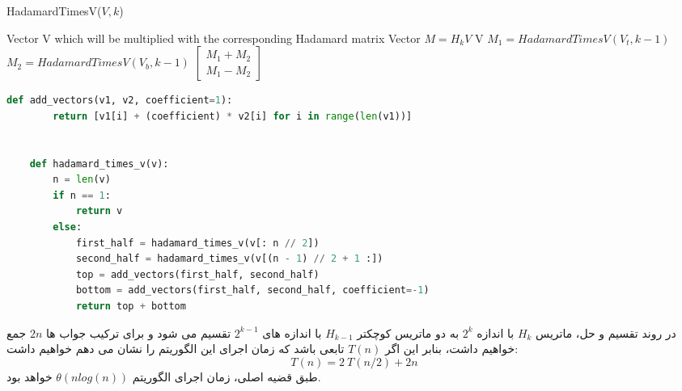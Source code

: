 \documentclass[]{article}
\begin{document}
\begin{latin}
    \begin{algorithm}[H]
        \caption*{HadamardTimesV($V, k$)}
        \begin{algorithmic}
            \Require Vector V which will be multiplied with the corresponding Hadamard matrix
            \Ensure Vector $M = H_kV$
                \State \Return V
            \Else
                \State $M_1 = HadamardTimesV(V_t, k-1)$
                \State $M_2 = HadamardTimesV(V_b, k-1)$
                \State \Return $\left[
                        \begin{matrix}
                            M_1 + M_2 \\
                            M_1 - M_2
                        \end{matrix}  
                        \right]
                       $
            \EndIf
        \end{algorithmic}
    \end{algorithm}
\end{latin}

\begin{latin}
    \begin{lstlisting}[language=Python, caption=Python Implementation]
    def add_vectors(v1, v2, coefficient=1):
        return [v1[i] + (coefficient) * v2[i] for i in range(len(v1))]
    
    
    def hadamard_times_v(v):
        n = len(v)
        if n == 1:
            return v
        else:
            first_half = hadamard_times_v(v[: n // 2])
            second_half = hadamard_times_v(v[(n - 1) // 2 + 1 :])
            top = add_vectors(first_half, second_half)
            bottom = add_vectors(first_half, second_half, coefficient=-1)
            return top + bottom
    \end{lstlisting}
\end{latin}

در روند تقسیم و حل، ماتریس $H_k$ با اندازه $2^k$
به دو ماتریس کوچکتر $H_{k-1}$ با اندازه های $2^{k-1}$ تقسیم می شود
و برای ترکیب جواب ها $2n$ جمع خواهیم داشت، بنابر این
اگر $T(n)$ تابعی باشد که زمان اجرای این الگوریتم را نشان می دهم خواهیم داشت:
$$T(n) = 2\:T(n/2) + 2n$$
طبق قضیه اصلی، زمان اجرای الگوریتم $\theta(nlog(n))$ خواهد بود.
\end{document}
